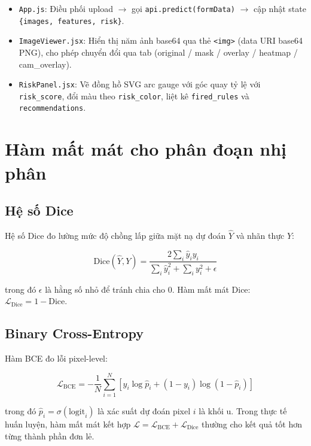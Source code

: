 \begin{sloppypar}
\begin{itemize}
    \item \texttt{App.js}: Điều phối upload $\to$ gọi \texttt{api.predict(formData)} $\to$ cập nhật state \texttt{\{images, features, risk\}}.
    \item \texttt{ImageViewer.jsx}: Hiển thị năm ảnh base64 qua thẻ \texttt{<img>} (data URI base64 PNG), cho phép chuyển đổi qua tab (original / mask / overlay / heatmap / cam\_overlay).
    \item \texttt{RiskPanel.jsx}: Vẽ đồng hồ SVG arc gauge với góc quay tỷ lệ với \texttt{risk\_score}, đổi màu theo \texttt{risk\_color}, liệt kê \texttt{fired\_rules} và \texttt{recommendations}.
\end{itemize}
\end{sloppypar}

\section{Hàm mất mát cho phân đoạn nhị phân}

\subsection{Hệ số Dice}

Hệ số Dice đo lường mức độ chồng lấp giữa mặt nạ dự đoán $\hat{Y}$ và nhãn thực $Y$:

\begin{equation}
    \text{Dice}(\hat{Y}, Y) = \frac{2 \sum_{i} \hat{y}_i y_i}{\sum_{i} \hat{y}_i^2 + \sum_{i} y_i^2 + \epsilon}
    \label{eq:dice}
\end{equation}

trong đó $\epsilon$ là hằng số nhỏ để tránh chia cho 0. Hàm mất mát Dice: $\mathcal{L}_{\text{Dice}} = 1 - \text{Dice}$.

\subsection{Binary Cross-Entropy}

Hàm BCE đo lỗi pixel-level:

\begin{equation}
    \mathcal{L}_{\text{BCE}} = -\frac{1}{N} \sum_{i=1}^{N} \left[ y_i \log \hat{p}_i + (1 - y_i) \log(1 - \hat{p}_i) \right]
    \label{eq:bce}
\end{equation}

trong đó $\hat{p}_i = \sigma(\text{logit}_i)$ là xác suất dự đoán pixel $i$ là khối u. Trong thực tế huấn luyện, hàm mất mát kết hợp $\mathcal{L} = \mathcal{L}_{\text{BCE}} + \mathcal{L}_{\text{Dice}}$ thường cho kết quả tốt hơn từng thành phần đơn lẻ.


